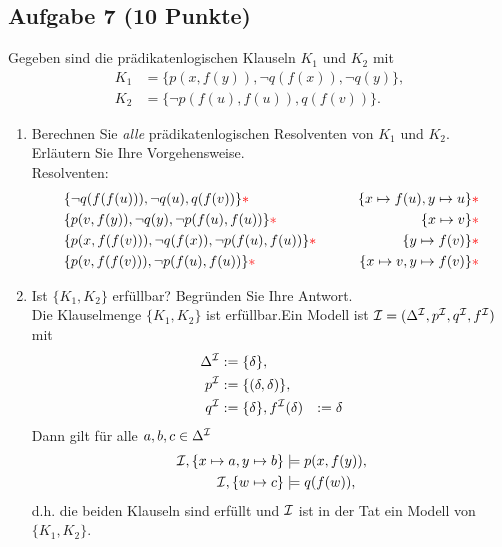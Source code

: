 \subsection*{Aufgabe 7 (10 Punkte)}
    Gegeben sind die prädikatenlogischen Klauseln $K_1$ und $K_2$ mit
    \begin{align*}
        K_1 &= \{p(x,f(y)), \neg q(f(x)), \neg q(y)\}, \\
        K_2 &= \{\neg p(f(u), f(u)), q(f(v))\}.
    \end{align*}

    \begin{enumerate}
        \item Berechnen Sie \textit{alle} prädikatenlogischen Resolventen von $K_1$ und $K_2$. Erläutern Sie Ihre Vorgehensweise. \\
        \LOES Resolventen:
        \begin{align*}
            &\{\neg q(f(f(u))), \neg q(u), q(f(v)) \}{\textcolor{red}{* }} \qquad &\{x \mapsto f(u), y \mapsto u\}{\textcolor{red}{* }} \\
            &\{p(v,f(y)), \neg q(y), \neg p(f(u),f(u)) \}{\textcolor{red}{* }} \qquad &\{x \mapsto v\}{\textcolor{red}{* }} \\
            &\{p(x,f(f(v))), \neg q(f(x)), \neg p(f(u),f(u)) \}{\textcolor{red}{* }} \qquad &\{y \mapsto f(v)\}{\textcolor{red}{* }} \\
            &\{p(v,f(f(v))), \neg p(f(u),f(u)) \}{\textcolor{red}{* }} \qquad &\{x \mapsto v, y \mapsto f(v)\}{\textcolor{red}{* }} \\
        \end{align*}

        \item Ist $\{K_1, K_2\}$ erfüllbar? Begründen Sie Ihre Antwort. \\
        \LOES Die Klauselmenge $\{K_1, K_2\}$ ist erfüllbar.\POINT Ein Modell ist $\mathcal{I} = (\Delta^{\mathcal{I}}, p^{\mathcal{I}}, q^{\mathcal{I}}, f^{\mathcal{I}})$ mit
        \begin{align*}
            \Delta^{\mathcal{I}} &:= \{\delta\}, \\
            p^{\mathcal{I}} &:= \{(\delta,\delta)\}, \\
            q^{\mathcal{I}} &:= \{\delta\},
            f^{\mathcal{I}}(\delta) &:= \delta
        \end{align*}
        Dann gilt für alle $a,b,c \in \Delta^{\mathcal{I}}$
        \begin{align*}
            \mathcal{I}, \{x \mapsto a, y \mapsto b\} &\models p(x,f(y)),\\
            \mathcal{I}, \{w \mapsto c\} &\models q(f(w)),
        \end{align*}
        d.h. die beiden Klauseln sind erfüllt und $\mathcal{I}$ ist in der Tat ein Modell von $\{K_1, K_2\}$.\POINT
    \end{enumerate}

